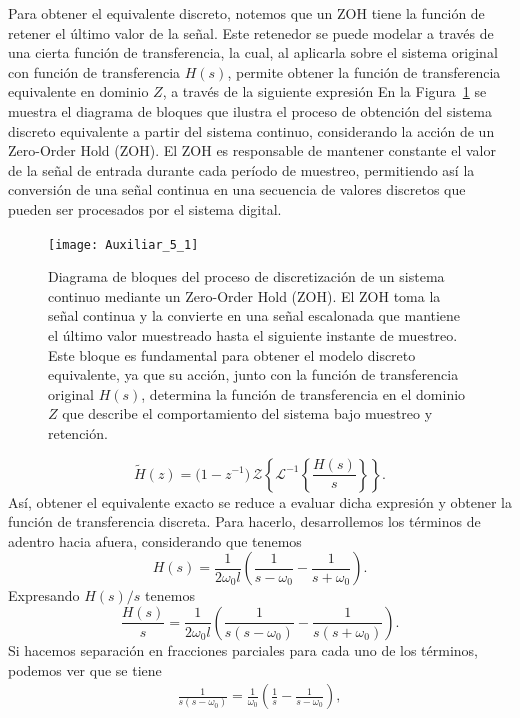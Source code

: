 \documentclass[
  11pt,
  letterpaper,
   addpoints,
  answers
  ]{exam}
\begin{document}
\begin{questions}
\begin{solution}
Para obtener el equivalente discreto, notemos que un ZOH tiene la función de retener el último valor de la señal. Este retenedor se puede modelar a través de una cierta función de transferencia, la cual, al aplicarla sobre el sistema original con función de transferencia $H(s)$, permite obtener la función de transferencia equivalente en dominio $Z$, a través de la siguiente expresión
En la Figura~\ref{fig:2_5} se muestra el diagrama de bloques que ilustra el proceso de obtención del sistema discreto equivalente a partir del sistema continuo, considerando la acción de un Zero-Order Hold (ZOH). El ZOH es responsable de mantener constante el valor de la señal de entrada durante cada período de muestreo, permitiendo así la conversión de una señal continua en una secuencia de valores discretos que pueden ser procesados por el sistema digital.
\begin{figure}[H]
  \centering
  \texttt{[image: Auxiliar\_5\_1]}
  \caption{Diagrama de bloques del proceso de discretización de un sistema continuo mediante un Zero-Order Hold (ZOH). El ZOH toma la señal continua y la convierte en una señal escalonada que mantiene el último valor muestreado hasta el siguiente instante de muestreo. Este bloque es fundamental para obtener el modelo discreto equivalente, ya que su acción, junto con la función de transferencia original $H(s)$, determina la función de transferencia en el dominio $Z$ que describe el comportamiento del sistema bajo muestreo y retención.}
  \label{fig:2_5}
\end{figure}
\begin{equation}
\tilde{H}(z)=\big(1-z^{-1}\big)\,\mathcal{Z}\!\left\{\mathcal{L}^{-1}\!\left\{\frac{H(s)}{s}\right\}\right\}.
\end{equation}
Así, obtener el equivalente exacto se reduce a evaluar dicha expresión y obtener la función de transferencia discreta. Para hacerlo, desarrollemos los términos de adentro hacia afuera, considerando que tenemos
\begin{equation}
H(s)=\frac{1}{2\omega_0 l}\left(\frac{1}{s-\omega_0}-\frac{1}{s+\omega_0}\right).
\end{equation}
Expresando $H(s)/s$ tenemos
\begin{equation}
\frac{H(s)}{s}=\frac{1}{2\omega_0 l}
\left(\frac{1}{s(s-\omega_0)}-\frac{1}{s(s+\omega_0)}\right).
\end{equation}
Si hacemos separación en fracciones parciales para cada uno de los términos, podemos ver que se tiene
\begin{align}
\frac{1}{s(s-\omega_0)}=\frac{1}{\omega_0}\left(\frac{1}{s}-\frac{1}{s-\omega_0}\right),\\

\end{align}
\end{solution}
\end{questions}
\end{document}
